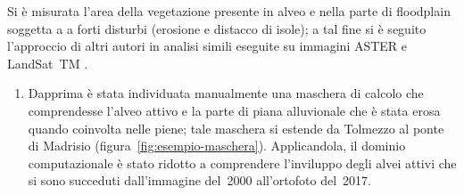 \documentclass[12pt,a4paper]{article}
\begin{document}
Si è misurata l'area della vegetazione presente in alveo e nella parte di floodplain soggetta a a forti disturbi (erosione e distacco di isole); 
a tal fine si è seguito l'approccio di altri autori in analisi simili eseguite su immagini ASTER e LandSat~TM \parencites{Bertoldi:2011-ASTER}{Henshaw:2013-LandSat}.
%
\begin{enumerate}
	\item Dapprima è stata individuata manualmente una maschera di calcolo che comprendesse l'alveo attivo e la parte di piana alluvionale che è stata erosa quando coinvolta nelle piene; 
	tale maschera si estende da Tolmezzo al ponte di Madrisio
	(figura~\ref{fig:esempio-maschera}). 
	Applicandola, il dominio computazionale è stato ridotto a comprendere l'inviluppo degli alvei attivi che si sono succeduti dall'immagine del~2000 all'ortofoto del~2017.
	\begin{figure}[ht]
		\centering
		\begin{subfigure}[b]{0.296\textwidth}

\end{subfigure}
\end{figure}
\end{enumerate}
\end{document}
